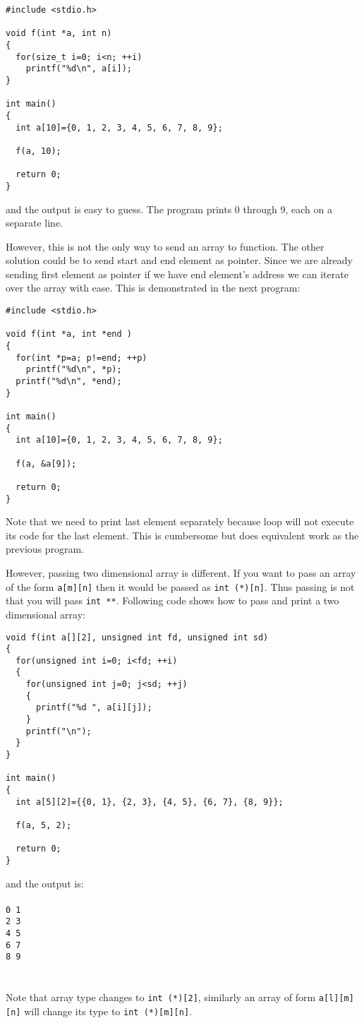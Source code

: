 \begin{verbatim}
#include <stdio.h>

void f(int *a, int n)
{
  for(size_t i=0; i<n; ++i)
    printf("%d\n", a[i]);
}

int main()
{
  int a[10]={0, 1, 2, 3, 4, 5, 6, 7, 8, 9};
 
  f(a, 10);
  
  return 0;
}
\end{verbatim}

and the output is easy to guess. The program prints 0 through 9, each on a
separate line.

However, this is not the only way to send an array to function. The other
solution could be to send start and end element as pointer. Since we are
already sending first element as pointer if we have end element's address we
can iterate over the array with ease. This is demonstrated in the next
program:

\begin{verbatim}
#include <stdio.h>

void f(int *a, int *end )
{
  for(int *p=a; p!=end; ++p)
    printf("%d\n", *p);
  printf("%d\n", *end);
}

int main()
{
  int a[10]={0, 1, 2, 3, 4, 5, 6, 7, 8, 9};
 
  f(a, &a[9]);
  
  return 0;
}
\end{verbatim}
Note that we need to print last element separately because loop will not
execute its code for the last element. This is cumbersome but does equivalent
work as the previous program.

However, passing two dimensional array is different. If you want to pass an
array of the form \texttt{a[m][n]} then it would be passed as \texttt{int
  (*)[n]}. Thus passing is not that you will pass \texttt{int **}. Following
code shows how to pass and print a two dimensional array:

\begin{verbatim}
void f(int a[][2], unsigned int fd, unsigned int sd)
{
  for(unsigned int i=0; i<fd; ++i)
  {
    for(unsigned int j=0; j<sd; ++j)
    {
      printf("%d ", a[i][j]);
    }
    printf("\n");
  }
}

int main()
{
  int a[5][2]={{0, 1}, {2, 3}, {4, 5}, {6, 7}, {8, 9}};
 
  f(a, 5, 2);
  
  return 0;
}
\end{verbatim}
and the output is:
\\\\\texttt{0 1\\
2 3\\
4 5\\
6 7\\
8 9\\
\\\\}
Note that array type changes to \texttt{int (*)[2]}, similarly an array of form
\texttt{a[l][m][n]} will change its type to \texttt{int (*)[m][n]}.

